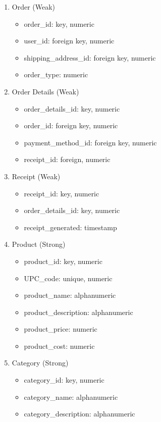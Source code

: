 \begin{enumerate}
\begin{itemize}
    \end{itemize}
\item Order (Weak)
    \begin{itemize}
        \item order\_id: key, numeric
        \item user\_id: foreign key, numeric
        \item shipping\_address\_id: foreign key, numeric
        \item order\_type: numeric
    \end{itemize}
\item Order Details (Weak)
    \begin{itemize}
        \item order\_details\_id: key, numeric
        \item order\_id: foreign key, numeric
        \item payment\_method\_id: foreign key, numeric
        \item receipt\_id: foreign, numeric
    \end{itemize}
\item Receipt (Weak)
    \begin{itemize}
        \item receipt\_id: key, numeric
        \item order\_details\_id: key, numeric
        \item receipt\_generated: timestamp
    \end{itemize}
\item Product (Strong)
    \begin{itemize}
        \item product\_id: key, numeric
        \item UPC\_code: unique, numeric
        \item product\_name: alphanumeric
        \item product\_description: alphanumeric
        \item product\_price: numeric
        \item product\_cost: numeric
    \end{itemize}
\item Category (Strong)
    \begin{itemize}
        \item category\_id: key, numeric
        \item category\_name: alphanumeric
        \item category\_description: alphanumeric
    \end{itemize}

\end{enumerate}
